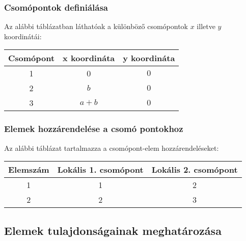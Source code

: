 \documentclass[12pt,a4paper]{article}
\begin{document}
\subsubsection{Csomópontok definiálása}
Az alábbi táblázatban láthatóak a különböző csomópontok $x$ illetve
$y$ koordinátái:
\begin{center}
    \begin{tabular}{|c|c|c|}
        \hline
        Csomópont & x koordináta & y koordináta \\
        \hline
        \hline
        1         & 0            & $0$          \\
        \hline
        2         & $b$          & $0$          \\
        \hline
        3         & $a+b$        & $0$          \\
        \hline
    \end{tabular}
\end{center}

\subsubsection{Elemek hozzárendelése a csomó pontokhoz}
Az alábbi táblázat tartalmazza a csomópont-elem hozzárendeléseket:
\begin{center}
    \begin{tabular}{|c|c|c|}
        \hline
        Elemszám & Lokális 1. csomópont & Lokális 2. csomópont \\
        \hline
        \hline
        1        & 1                    & 2                    \\
        \hline
        2        & 2                    & 3                    \\
        \hline
    \end{tabular}
\end{center}

\subsection{Elemek tulajdonságainak meghatározása}
\end{document}
